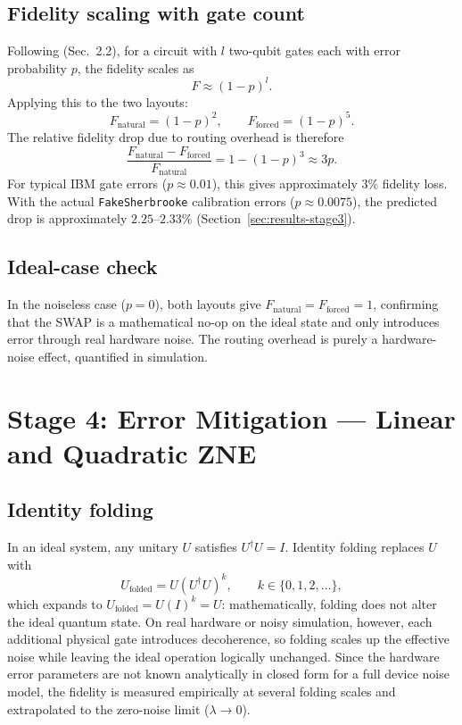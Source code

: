 \documentclass[11pt]{article}
\begin{document}
\subsection{Fidelity scaling with gate count}

Following \citet{rindell2023} (Sec.~2.2), for a circuit with $l$ two-qubit gates each with error probability $p$, the fidelity scales as
\begin{equation}
F \approx (1-p)^l.
\label{eq:F-gatecount}
\end{equation}
Applying this to the two layouts:
\begin{equation}
F_{\text{natural}} = (1-p)^2, \qquad F_{\text{forced}} = (1-p)^5.
\label{eq:F-layouts}
\end{equation}
The relative fidelity drop due to routing overhead is therefore
\begin{equation}
\frac{F_{\text{natural}}-F_{\text{forced}}}{F_{\text{natural}}} = 1-(1-p)^3 \approx 3p.
\label{eq:relative-drop}
\end{equation}
For typical IBM gate errors ($p\approx0.01$), this gives approximately $3\%$ fidelity loss. With the actual \texttt{FakeSherbrooke} calibration errors ($p\approx0.0075$), the predicted drop is approximately $2.25$--$2.33\%$ (Section~\ref{sec:results-stage3}).

\subsection{Ideal-case check}

In the noiseless case ($p=0$), both layouts give $F_{\text{natural}}=F_{\text{forced}}=1$, confirming that the SWAP is a mathematical no-op on the ideal state and only introduces error through real hardware noise. The routing overhead is purely a hardware-noise effect, quantified in simulation.

\section{Stage 4: Error Mitigation --- Linear and Quadratic ZNE}
\label{sec:stage4-theory}

\subsection{Identity folding}

In an ideal system, any unitary $U$ satisfies $U^\dagger U = I$. Identity folding replaces $U$ with
\begin{equation}
U_{\text{folded}} = U(U^\dagger U)^k, \qquad k\in\{0,1,2,\dots\},
\label{eq:folding}
\end{equation}
which expands to $U_{\text{folded}}=U(I)^k=U$: mathematically, folding does not alter the ideal quantum state. On real hardware or noisy simulation, however, each additional physical gate introduces decoherence, so folding scales up the effective noise while leaving the ideal operation logically unchanged. Since the hardware error parameters are not known analytically in closed form for a full device noise model, the fidelity is measured empirically at several folding scales and extrapolated to the zero-noise limit ($\lambda\to0$).
\end{document}
